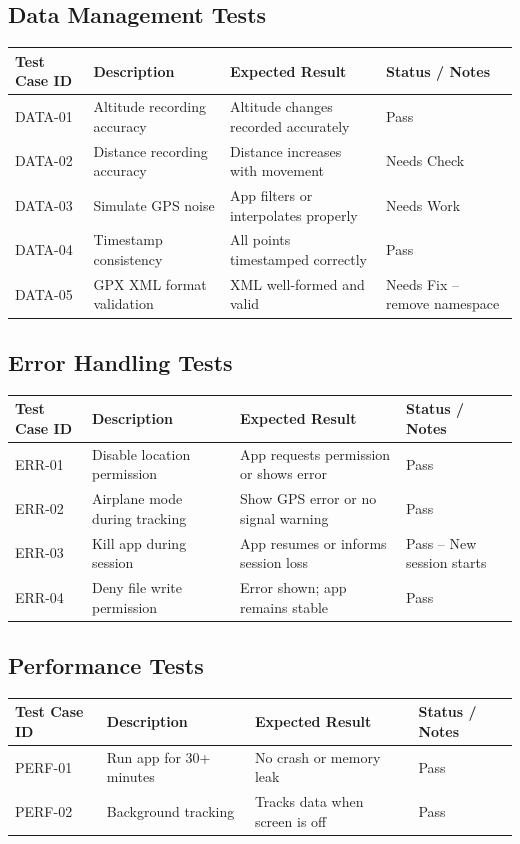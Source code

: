 \documentclass[12pt]{article}
\begin{document}
\subsection{Data Management Tests}
\begin{longtable}{|p{2.2cm}|p{5.2cm}|p{4cm}|p{2.5cm}|}
\hline
\textbf{Test Case ID} & \textbf{Description} & \textbf{Expected Result} & \textbf{Status / Notes} \\
\hline
DATA-01 & Altitude recording accuracy & Altitude changes recorded accurately & Pass \\
\hline
DATA-02 & Distance recording accuracy & Distance increases with movement & Needs Check \\
\hline
DATA-03 & Simulate GPS noise & App filters or interpolates properly & Needs Work \\
\hline
DATA-04 & Timestamp consistency & All points timestamped correctly & Pass \\
\hline
DATA-05 & GPX XML format validation & XML well-formed and valid & Needs Fix – remove namespace \\
\hline
\end{longtable}

\subsection{Error Handling Tests}
\begin{longtable}{|p{2.2cm}|p{5.2cm}|p{4cm}|p{2.5cm}|}
\hline
\textbf{Test Case ID} & \textbf{Description} & \textbf{Expected Result} & \textbf{Status / Notes} \\
\hline
ERR-01 & Disable location permission & App requests permission or shows error & Pass \\
\hline
ERR-02 & Airplane mode during tracking & Show GPS error or no signal warning & Pass \\
\hline
ERR-03 & Kill app during session & App resumes or informs session loss & Pass – New session starts \\
\hline
ERR-04 & Deny file write permission & Error shown; app remains stable & Pass \\
\hline
\end{longtable}

\subsection{Performance Tests}
\begin{longtable}{|p{2.2cm}|p{5.2cm}|p{4cm}|p{2.5cm}|}
\hline
\textbf{Test Case ID} & \textbf{Description} & \textbf{Expected Result} & \textbf{Status / Notes} \\
\hline
PERF-01 & Run app for 30+ minutes & No crash or memory leak & Pass \\
\hline
PERF-02 & Background tracking & Tracks data when screen is off & Pass \\
\hline
\end{longtable}
\end{document}
